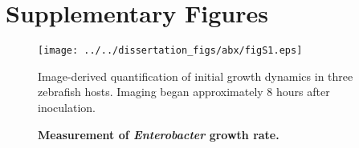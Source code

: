 %
%
\renewcommand\thefigure{\arabic{chapter}.S\arabic{figure}}    


\setcounter{figure}{0}

\section{Supplementary Figures}
\begin{figure}[H]
	\centerline{
		\texttt{[image: ../../dissertation\_figs/abx/figS1.eps]}}
	\caption{\textbf{Measurement of \textit{Enterobacter} growth rate.}}{Image-derived quantification of initial growth dynamics in three zebrafish hosts. Imaging began approximately 8 hours after inoculation.}
\end{figure}



